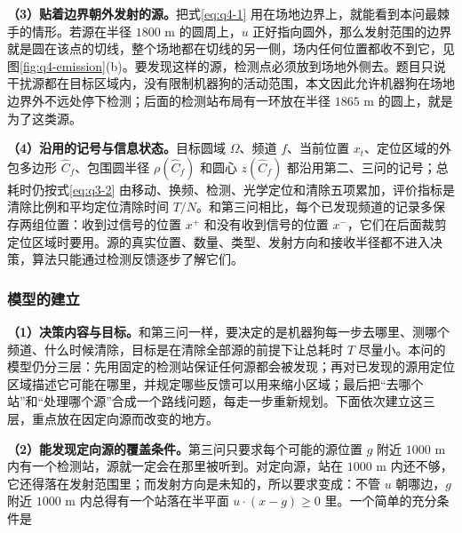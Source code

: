 \textbf{（3）贴着边界朝外发射的源。}把式\eqref{eq:q4-1} 用在场地边界上，就能看到本问最棘手的情形。若源在半径 $1800$ m 的圆周上，$u$ 正好指向圆外，那么发射范围的边界就是圆在该点的切线，整个场地都在切线的另一侧，场内任何位置都收不到它，见图\ref{fig:q4-emission}(b)。要发现这样的源，检测点必须放到场地外侧去。题目只说干扰源都在目标区域内，没有限制机器狗的活动范围，本文因此允许机器狗在场地边界外不远处停下检测；后面的检测站布局有一环放在半径 $1865$ m 的圆上，就是为了这类源。

\begin{center}
\begin{minipage}{\linewidth}
\centering
\QFourEmissionFigure
{}
\label{fig:q4-emission}
\end{minipage}
\end{center}

\textbf{（4）沿用的记号与信息状态。}目标圆域 $\Omega$、频道 $f$、当前位置 $x_t$、定位区域的外包多边形 $\widehat C_f$、包围圆半径 $\rho(\widehat C_f)$ 和圆心 $z(\widehat C_f)$ 都沿用第二、三问的记号；总耗时仍按式\eqref{eq:q3-2} 由移动、换频、检测、光学定位和清除五项累加，评价指标是清除比例和平均定位清除时间 $T/N$。和第三问相比，每个已发现频道的记录多保存两组位置：收到过信号的位置 $x^+$ 和没有收到信号的位置 $x^-$，它们在后面裁剪定位区域时要用。源的真实位置、数量、类型、发射方向和接收半径都不进入决策，算法只能通过检测反馈逐步了解它们。

\subsubsection{模型的建立}\label{sec:q4-2}

\textbf{（1）决策内容与目标。}和第三问一样，要决定的是机器狗每一步去哪里、测哪个频道、什么时候清除，目标是在清除全部源的前提下让总耗时 $T$ 尽量小。本问的模型仍分三层：先用固定的检测站保证任何源都会被发现；再对已发现的源用定位区域描述它可能在哪里，并规定哪些反馈可以用来缩小区域；最后把“去哪个站”和“处理哪个源”合成一个路线问题，每走一步重新规划。下面依次建立这三层，重点放在因定向源而改变的地方。

\textbf{（2）能发现定向源的覆盖条件。}第三问只要求每个可能的源位置 $g$ 附近 $1000$ m 内有一个检测站，源就一定会在那里被听到。对定向源，站在 $1000$ m 内还不够，它还得落在发射范围里；而发射方向是未知的，所以要求变成：不管 $u$ 朝哪边，$g$ 附近 $1000$ m 内总得有一个站落在半平面 $u\cdot(x-g)\ge0$ 里。一个简单的充分条件是

